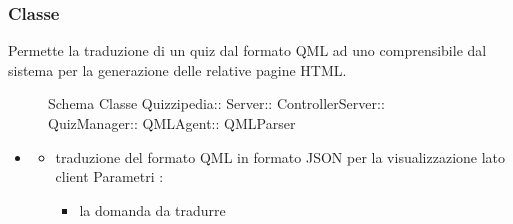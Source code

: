 \subsubsection{Classe }
Permette la traduzione di un quiz dal formato QML ad uno comprensibile dal sistema per la generazione delle relative pagine HTML.
\begin{figure}[H]
\centering
\noindent{}
\caption[Schema Classe QMLParser]{Schema Classe Quizzipedia:: Server:: ControllerServer:: QuizManager:: QMLAgent:: QMLParser}
\end{figure}
\begin{itemize}
\item {}
\begin{itemize}
\item {}
\newline
traduzione del formato QML in formato JSON per la visualizzazione lato client
\newline
Parametri :
\begin{itemize}
\item {}
\newline
la domanda da tradurre
\end{itemize}
\end{itemize}
\end{itemize}
